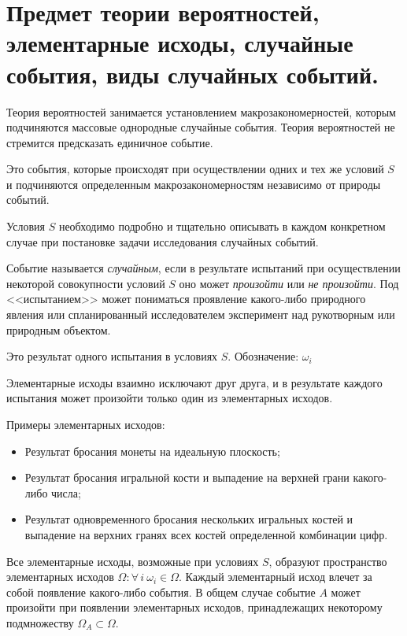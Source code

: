 \documentclass[polytech/stats/exam-2023/stats-exam-2023.tex]{subfiles}
\begin{document}
    \section{Предмет теории вероятностей, элементарные исходы, случайные события, виды случайных событий.}
    Теория вероятностей занимается установлением макрозакономерностей, которым подчиняются
    массовые однородные случайные события. Теория вероятностей не стремится предсказать
    единичное событие.
    \begin{definition}
        Это события, которые происходят при осуществлении одних и тех же условий $S$ и подчиняются
        определенным макрозакономерностям независимо от природы событий.
    \end{definition}
    Условия $S$ необходимо подробно и тщательно описывать в каждом конкретном случае при постановке
    задачи исследования случайных событий.

    \begin{definition}
        Событие называется \textit{случайным}, если в результате испытаний при осуществлении некоторой совокупности
        условий $S$ оно может \textit{произойти} или \textit{не произойти}. Под <<испытанием>> может пониматься
        проявление какого-либо природного явления или спланированный исследователем эксперимент над рукотворным
        или природным объектом.
    \end{definition}
    \begin{definition}
        Это результат одного испытания в условиях $S$. Обозначение: $\omega_i$
    \end{definition}
    \begin{theorem}
        Элементарные исходы взаимно исключают друг друга, и в результате каждого испытания может произойти
        только один из элементарных исходов.
    \end{theorem}
    Примеры элементарных исходов:
    \begin{itemize}
        \item Результат бросания монеты на идеальную плоскость;
        \item Результат бросания игральной кости и выпадение на верхней грани какого-либо числа;
        \item Результат одновременного бросания нескольких игральных костей и выпадение на верхних
        гранях всех костей определенной комбинации цифр.
    \end{itemize}
    Все элементарные исходы, возможные при условиях $S$, образуют пространство элементарных исходов
    $\Omega: \forall \, i \ \omega_i \in \Omega$. Каждый элементарный исход влечет за собой появление какого-либо
    события. В общем случае событие $A$ может произойти при появлении элементарных исходов, принадлежащих
    некоторому подмножеству $\Omega_A \subset \Omega$.
\end{document}
